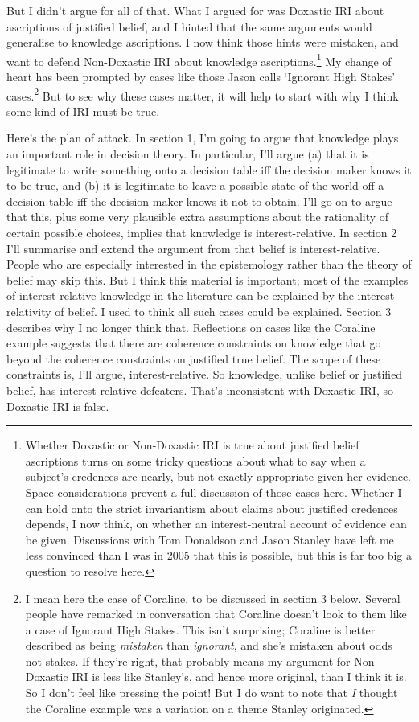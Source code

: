 \noindent But I didn't argue for all of that. What I argued for was Doxastic IRI about ascriptions of justified belief, and I hinted that the same arguments would generalise to knowledge ascriptions. I now think those hints were mistaken, and want to defend Non-Doxastic IRI about knowledge ascriptions.\footnote{Whether Doxastic or Non-Doxastic IRI is true about justified belief ascriptions turns on some tricky questions about what to say when a subject's credences are nearly, but not exactly appropriate given her evidence. Space considerations prevent a full discussion of those cases here. Whether I can hold onto the strict invariantism about claims about justified credences depends, I now think, on whether an interest-neutral account of evidence can be given. Discussions with Tom Donaldson and Jason Stanley have left me less convinced than I was in 2005 that this is possible, but this is far too big a question to resolve here.} My change of heart has been prompted by cases like those Jason \citet{Stanley2005-STAKAP} calls `Ignorant High Stakes' cases.\footnote{I mean here the case of Coraline, to be discussed in section 3 below. Several people have remarked in conversation that Coraline doesn't look to them like a case of Ignorant High Stakes. This isn't surprising; Coraline is better described as being \textit{mistaken} than \textit{ignorant}, and she's mistaken about odds not stakes. If they're right, that probably means my argument for Non-Doxastic IRI is less like Stanley's, and hence more original, than I think it is. So I don't feel like pressing the point! But I do want to note that \textit{I} thought the Coraline example was a variation on a theme Stanley originated.} But to see why these cases matter, it will help to start with why I think some kind of IRI must be true. 

Here's the plan of attack. In section 1, I'm going to argue that knowledge plays an important role in decision theory. In particular, I'll argue (a) that it is legitimate to write something onto a decision table iff the decision maker knows it to be true, and (b) it is legitimate to leave a possible state of the world off a decision table iff the decision maker knows it not to obtain. I'll go on to argue that this, plus some very plausible extra assumptions about the rationality of certain possible choices, implies that knowledge is interest-relative. In section 2 I'll summarise and extend the argument from \citet{Weatherson2005-WEACWD} that belief is interest-relative. People who are especially interested in the epistemology rather than the theory of belief may skip this. But I think this material is important; most of the examples of interest-relative knowledge in the literature can be explained by the interest-relativity of belief. I used to think all such cases could be explained. Section 3 describes why I no longer think that. Reflections on cases like the Coraline example suggests that there are coherence constraints on knowledge that go beyond the coherence constraints on justified true belief. The scope of these constraints is, I'll argue, interest-relative. So knowledge, unlike belief or justified belief, has interest-relative defeaters. That's inconsistent with Doxastic IRI, so Doxastic IRI is false.

